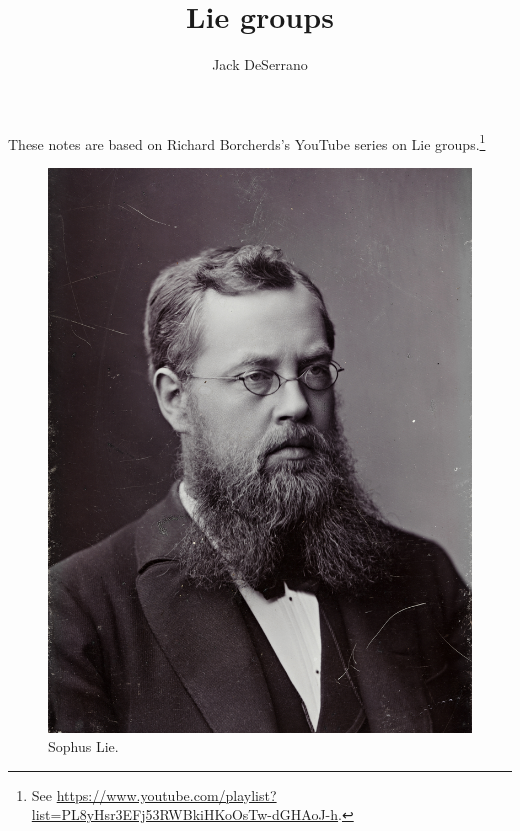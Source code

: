 \documentclass [11 pt, twoside] {article}
\title {Lie groups}
\author {Jack DeSerrano}
\begin{document}
\maketitle

These notes are based on Richard Borcherds's YouTube series on Lie groups.\footnote{See \url{https://www.youtube.com/playlist?list=PL8yHsr3EFj53RWBkiHKoOsTw-dGHAoJ-h}.}

\begin {figure}
	\begin {center}
		\includegraphics [scale = 0.33] {images/lie}
		\caption {Sophus Lie.}
	\end {center}
\end {figure}

\newpage

\end{document}
